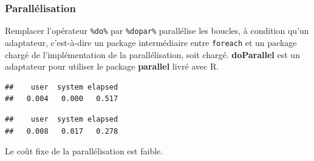\documentclass[
  12pt,
  french,
  a4paper,
  extrafontsizes,onecolumn,openright
  ]{memoir}
\newenvironment{Shaded}{\begin{snugshade}}{\end{snugshade}}
\newcommand{\CommentTok}[1]{\textcolor[rgb]{0.56,0.35,0.01}{\textit{#1}}}
\newcommand{\DataTypeTok}[1]{\textcolor[rgb]{0.13,0.29,0.53}{#1}}
\newcommand{\KeywordTok}[1]{\textcolor[rgb]{0.13,0.29,0.53}{\textbf{#1}}}
\newcommand{\NormalTok}[1]{#1}
\newcommand{\OperatorTok}[1]{\textcolor[rgb]{0.81,0.36,0.00}{\textbf{#1}}}
\newcommand{\StringTok}[1]{\textcolor[rgb]{0.31,0.60,0.02}{#1}}
\begin{document}
\hypertarget{paralluxe9lisation}{%
\subsubsection{Parallélisation}\label{paralluxe9lisation}}

Remplacer l'opérateur \texttt{\%do\%} par \texttt{\%dopar\%} parallélise les boucles, à condition qu'un adaptateur, c'est-à-dire un package intermédiaire entre \texttt{foreach} et un package chargé de l'implémentation de la parallélisation, soit chargé.
\textbf{doParallel} est un adaptateur pour utiliser le package \textbf{parallel} livré avec R.

\scriptsize

\begin{Shaded}
\end{Shaded}

\begin{verbatim}
##    user  system elapsed 
##   0.004   0.000   0.517
\end{verbatim}

\begin{Shaded}
\end{Shaded}

\begin{verbatim}
##    user  system elapsed 
##   0.008   0.017   0.278
\end{verbatim}

\normalsize

Le coût fixe de la parallélisation est faible.
\end{document}
